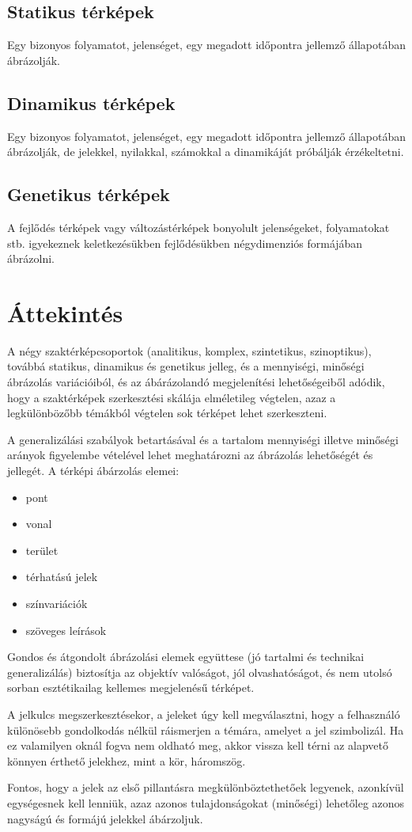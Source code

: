 	\subsection{Statikus térképek}
	Egy bizonyos folyamatot, jelenséget, egy megadott időpontra jellemző állapotában ábrázolják.
	
	\subsection{Dinamikus térképek}
	Egy bizonyos folyamatot, jelenséget, egy megadott időpontra jellemző állapotában ábrázolják, de
	jelekkel, nyilakkal, számokkal a dinamikáját próbálják érzékeltetni.
	
	\subsection{Genetikus térképek}
	A fejlődés térképek vagy változástérképek bonyolult jelenségeket, folyamatokat stb. igyekeznek keletkezésükben
	fejlődésükben négydimenziós formájában ábrázolni.
	
	\section{Áttekintés}
	A négy szaktérképcsoportok (analitikus, komplex, szintetikus, szinoptikus), továbbá statikus, dinamikus és genetikus
	jelleg, és a mennyiségi, minőségi ábrázolás variációiból, és az ábárázolandó megjelenítési lehetőségeiből adódik, hogy
	a szaktérképek szerkesztési skálája elméletileg végtelen, azaz a legkülönbözőbb témákból végtelen sok térképet lehet szerkeszteni.
	
	A generalizálási szabályok betartásával és a tartalom mennyiségi illetve minőségi arányok figyelembe vételével lehet
	meghatározni az ábrázolás lehetőségét és jellegét. A térképi ábárzolás elemei:
	\begin{itemize}
		\item pont
		\item vonal
		\item terület
		\item térhatású jelek
		\item színvariációk
		\item szöveges leírások
	\end{itemize}
	Gondos és átgondolt ábrázolási elemek együttese (jó tartalmi és technikai generalizálás) biztosítja az objektív valóságot,
	jól olvashatóságot, és nem utolsó sorban esztétikailag kellemes megjelenésű térképet.
	
	A jelkulcs megszerkesztésekor, a jeleket úgy kell megválasztni, hogy a felhasználó különösebb gondolkodás nélkül
	ráismerjen a témára, amelyet a jel szimbolizál. Ha ez valamilyen oknál fogva nem oldható meg, akkor vissza kell térni az alapvető
	könnyen érthető jelekhez, mint a kör, háromszög.
	
	Fontos, hogy a jelek az első pillantásra megkülönböztethetőek legyenek, azonkívül egységesnek kell lenniük, azaz
	azonos tulajdonságokat (minőségi) lehetőleg azonos nagyságú és formájú jelekkel ábárzoljuk.
